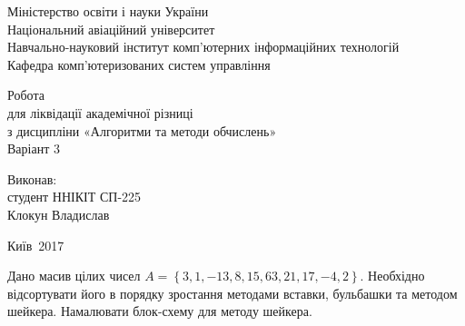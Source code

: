 \documentclass[a4paper,oneside,DIV=12,12pt]{scrartcl}
\begin{document}
	\begin{titlepage}
		\begin{center}
			Міністерство освіти і науки України\\
			Національний авіаційний університет\\
			Навчально-науковий інститут комп'ютерних інформаційних технологій\\
			Кафедра комп'ютеризованих систем управління
			
			\vspace{\fill}
				Робота\\
				для ліквідації академічної різниці\\
				з дисципліни «Алгоритми та методи обчислень»\\
				Варіант 3
				
			\vspace{\fill}
			
			\begin{flushright}
				Виконав:\\
				студент ННІКІТ СП-225\\
				Клокун Владислав\\
			\end{flushright}
			Київ~2017
		\end{center}
	\end{titlepage}
	
	\begin{exercise}
		Дано масив цілих чисел $A = \left\{ 3, 1, -13, 8, 15, 63,21, 17, -4, 2\right\}$. Необхідно відсортувати його в порядку зростання методами вставки, бульбашки та методом шейкера. Намалювати блок-схему для методу шейкера.
	\end{exercise}
	
\end{document}
